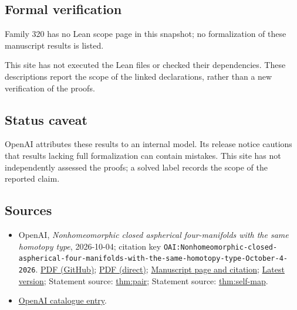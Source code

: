 \documentclass[11pt]{article}
\begin{document}
\subsection{Formal verification}
Family 320 has no Lean scope page in this snapshot; no formalization of these manuscript results is listed.

This site has not executed the Lean files or checked their dependencies. These descriptions report the scope of the linked declarations, rather than a new verification of the proofs.

\subsection{Status caveat}
OpenAI attributes these results to an internal model. Its release notice cautions that results lacking full formalization can contain mistakes. This site has not independently assessed the proofs; a solved label records the scope of the reported claim.

\subsection{Sources}
\begin{itemize}
\item OpenAI, \emph{Nonhomeomorphic closed aspherical four-manifolds with the same homotopy type}, 2026-10-04; citation key \texttt{OAI:Nonhomeomorphic-closed-aspherical-four-manifolds-with-the-same-homotopy-type-October-4-2026}. \href{https://github.com/openai/math/blob/adc7f1241b42e322a6451854ab7e4b4c146bf78a/preprints/Nonhomeomorphic-closed-aspherical-four-manifolds-with-the-same-homotopy-type-October-4-2026/paper.pdf}{PDF (GitHub)}; \href{https://github.com/openai/math/raw/adc7f1241b42e322a6451854ab7e4b4c146bf78a/preprints/Nonhomeomorphic-closed-aspherical-four-manifolds-with-the-same-homotopy-type-October-4-2026/paper.pdf}{PDF (direct)}; \href{https://github.com/openai/math/blob/adc7f1241b42e322a6451854ab7e4b4c146bf78a/preprints/Nonhomeomorphic-closed-aspherical-four-manifolds-with-the-same-homotopy-type-October-4-2026/README.md}{Manuscript page and citation}; \href{https://github.com/openai/math/blob/main/preprints/Nonhomeomorphic-closed-aspherical-four-manifolds-with-the-same-homotopy-type-October-4-2026/paper.pdf}{Latest version}; Statement source: \href{https://github.com/openai/math/blob/adc7f1241b42e322a6451854ab7e4b4c146bf78a/preprints/Nonhomeomorphic-closed-aspherical-four-manifolds-with-the-same-homotopy-type-October-4-2026/build/sections/introduction.tex\#L12}{thm:pair}; Statement source: \href{https://github.com/openai/math/blob/adc7f1241b42e322a6451854ab7e4b4c146bf78a/preprints/Nonhomeomorphic-closed-aspherical-four-manifolds-with-the-same-homotopy-type-October-4-2026/build/sections/introduction.tex\#L22}{thm:self-map}.
\item \href{https://github.com/openai/math/blob/adc7f1241b42e322a6451854ab7e4b4c146bf78a/CONTENTS.md}{OpenAI catalogue entry}.
\end{itemize}
\end{document}
